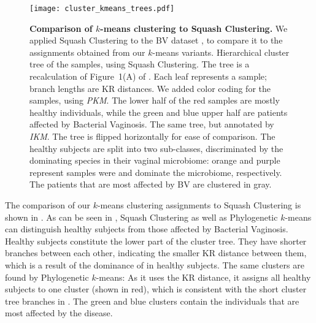 \begin{figure}[p]
    \centering
    \texttt{[image: cluster\_kmeans\_trees.pdf]}
    \begin{subfigure}{0pt}
        \label{fig:cluster_kmeans_trees:sub:mass_tree}
    \end{subfigure}
    \begin{subfigure}{0pt}
        \label{fig:cluster_kmeans_trees:sub:imbalance_tree}
    \end{subfigure}
    \caption[Comparison of $k$-means clustering to Squash Clustering]{
        \textbf{Comparison of $k$-means clustering to Squash Clustering.}
        We applied Squash Clustering to the \ac{BV} dataset \cite{Srinivasan2012},
        to compare it to the assignments obtained from our $k$-means variants.
        Hierarchical cluster tree of the samples, using Squash Clustering.
        The tree is a recalculation of Figure~1(A) of \cite{Srinivasan2012}.
        Each leaf represents a sample; branch lengths are KR distances.
        We added color coding for the samples, using \emph{PKM}.
        The lower half of the red samples are mostly healthy individuals,
        while the green and blue upper half are patients affected by Bacterial Vaginosis.
        The same tree, but annotated by \emph{IKM}.
        The tree is flipped horizontally for ease of comparison.
        The healthy subjects are split into two sub-classes,
        discriminated by the dominating species in their vaginal microbiome:
        orange and purple represent samples were  and 
        dominate the microbiome, respectively.
        The patients that are most affected by BV are clustered in gray.
    }
    \label{fig:cluster_kmeans_trees}
\end{figure}

The comparison of our $k$-means clustering assignments to Squash Clustering is shown in .
As can be seen in , Squash Clustering as well as
Phylogenetic $k$-means can distinguish healthy subjects from those affected by Bacterial Vaginosis.
Healthy subjects constitute the lower part of the cluster tree.
They have shorter branches between each other, indicating the smaller KR distance between them,
which is a result of the dominance of  in healthy subjects.
The same clusters are found by Phylogenetic $k$-means:
As it uses the KR distance, it assigns all healthy subjects to one cluster (shown in red),
which is consistent with the short cluster tree branches in .
The green and blue clusters contain the individuals that are most affected by the disease.

